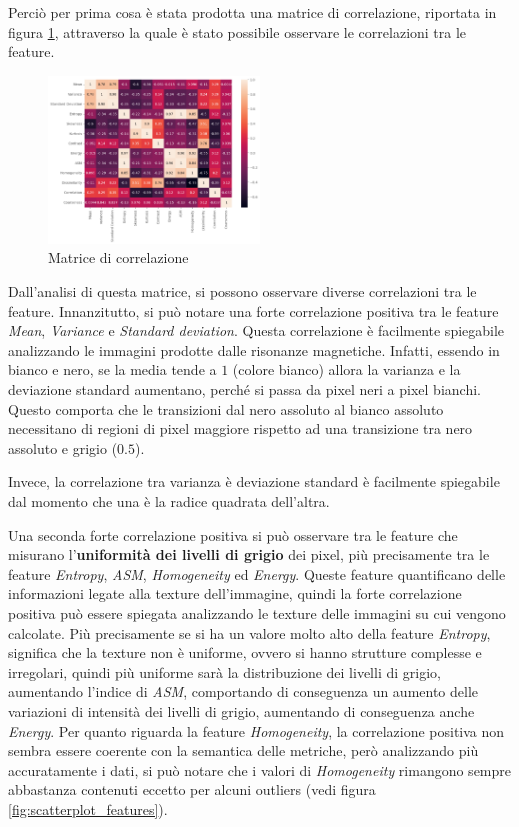 Perciò per prima cosa è stata prodotta una matrice di correlazione, riportata in
figura \ref{fig:corr-matrix}, attraverso la quale è stato possibile osservare le
correlazioni tra le feature.
\begin{figure}[!ht]
      \centering
      \includegraphics[width=0.5\textwidth]{img/analisi/corr.png}
      \caption{Matrice di correlazione}
      \label{fig:corr-matrix}
\end{figure}

Dall'analisi di questa matrice, si possono osservare diverse correlazioni tra le
feature. Innanzitutto, si può notare una forte correlazione positiva tra le
feature \textit{Mean}, \textit{Variance} e \textit{Standard deviation}. Questa
correlazione è facilmente spiegabile analizzando le immagini prodotte dalle
risonanze magnetiche. Infatti, essendo in bianco e nero, se la media tende a $1$
(colore bianco) allora la varianza e la deviazione standard aumentano, perché si
passa da pixel neri a pixel bianchi. Questo comporta che le transizioni dal nero
assoluto al bianco assoluto necessitano di regioni di pixel maggiore rispetto
ad una transizione tra nero assoluto e grigio ($0.5$).

Invece, la correlazione tra varianza è deviazione standard è facilmente spiegabile
dal momento che una è la radice quadrata dell'altra.

Una seconda forte correlazione positiva si può osservare tra le feature che
misurano l'\textbf{uniformità dei livelli di grigio} dei pixel, più precisamente
tra le feature \textit{Entropy}, \textit{ASM}, \textit{Homogeneity} ed
\textit{Energy}. Queste feature quantificano delle informazioni legate alla
texture dell'immagine, quindi la forte correlazione positiva può essere spiegata
analizzando le texture delle immagini su cui vengono calcolate. Più precisamente
se si ha un valore molto alto della feature \textit{Entropy}, significa che la
texture non è uniforme, ovvero si hanno strutture complesse e irregolari, quindi
più uniforme sarà la distribuzione dei livelli di grigio, aumentando l'indice
di \textit{ASM}, comportando di conseguenza un aumento delle variazioni di intensità
dei livelli di grigio, aumentando di conseguenza anche \textit{Energy}. Per quanto
riguarda la feature \textit{Homogeneity}, la correlazione positiva non sembra 
essere coerente con la semantica delle metriche, però analizzando più accuratamente i 
dati, si può notare che i valori di \textit{Homogeneity} rimangono sempre abbastanza
contenuti eccetto per alcuni outliers (vedi figura \ref{fig:scatterplot_features}).

